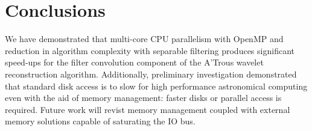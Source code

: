 \section{Conclusions}

We have demonstrated that multi-core CPU parallelism with OpenMP and reduction in algorithm complexity with separable filtering produces significant speed-ups for the filter convolution component of the A'Trous wavelet reconstruction algorithm. Additionally, preliminary investigation demonstrated that standard disk access is to slow for high performance astronomical computing even with the aid of memory management: faster disks or parallel access is required.  Future work will revist memory management coupled with external memory solutions capable of saturating the IO bus.


